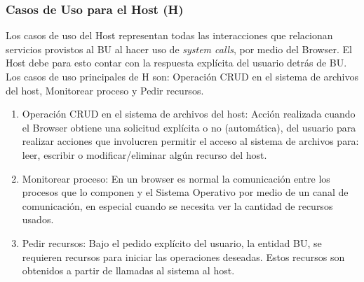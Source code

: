 \subsubsection{Casos de Uso para el Host (H)}
Los casos de uso del Host representan todas las interacciones que relacionan servicios provistos al BU al hacer uso de \textit{system calls}, por medio del Browser. El Host debe para esto contar con la respuesta explícita del usuario detrás de BU. Los casos de uso principales de H son: Operación CRUD en el sistema de archivos del host, Monitorear proceso y Pedir recursos.
			\begin{enumerate}
				\item Operación CRUD en el sistema de archivos del host: Acción realizada cuando el Browser obtiene una solicitud explícita o no (automática), del usuario para realizar acciones que involucren permitir el acceso al sistema de archivos para: leer, escribir o modificar/eliminar algún recurso del host.

				\item Monitorear proceso: En un browser es normal la comunicación entre los procesos que lo componen y el Sistema Operativo por medio de un canal de comunicación, en especial cuando se necesita ver la cantidad de recursos usados.

				\item Pedir recursos: Bajo el pedido explícito del usuario, la entidad BU, se requieren recursos para iniciar las operaciones deseadas. Estos recursos son obtenidos a partir de llamadas al sistema al host.
			\end{enumerate}

